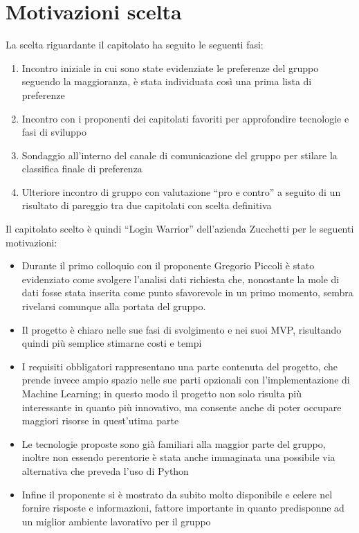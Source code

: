 \section{Motivazioni scelta}
La scelta riguardante il capitolato ha seguito le seguenti fasi:
\begin{enumerate}
	\item Incontro iniziale in cui sono state evidenziate le preferenze del gruppo seguendo la maggioranza, è stata individuata così una prima lista di preferenze
	\item Incontro con i proponenti dei capitolati favoriti per approfondire tecnologie e fasi di sviluppo
	\item Sondaggio all'interno del canale di comunicazione del gruppo per stilare la classifica finale di preferenza
	\item Ulteriore incontro di gruppo con valutazione ``pro e contro'' a seguito di un risultato di pareggio tra due capitolati con scelta definitiva
\end{enumerate}
Il capitolato scelto è quindi ``Login Warrior'' dell'azienda Zucchetti per le seguenti motivazioni:
\begin{itemize}
	\item Durante il primo colloquio con il proponente Gregorio Piccoli è stato evidenziato come svolgere l'analisi dati richiesta che, nonostante la mole di dati fosse stata inserita come punto sfavorevole in un primo momento, sembra rivelarsi comunque alla portata del gruppo.
	\item Il progetto è chiaro nelle sue fasi di svolgimento e nei suoi MVP, risultando quindi più semplice stimarne costi e tempi
	\item I requisiti obbligatori rappresentano una parte contenuta del progetto, che prende invece ampio spazio nelle sue parti opzionali con l'implementazione di Machine Learning; in questo modo il progetto non solo risulta più interessante in quanto più innovativo, ma consente anche di poter occupare maggiori risorse in quest'utima parte
	\item Le tecnologie proposte sono già familiari alla maggior parte del gruppo, inoltre non essendo perentorie è stata anche immaginata una possibile via alternativa che preveda l'uso di Python
	\item Infine il proponente si è mostrato da subito molto disponibile e celere nel fornire risposte e informazioni, fattore importante in quanto predisponne ad un miglior ambiente lavorativo per il gruppo
\end{itemize}